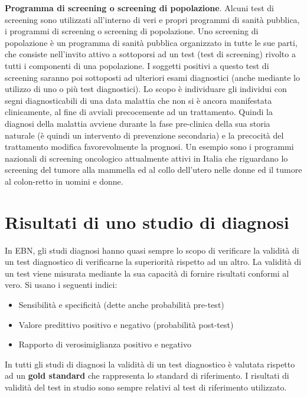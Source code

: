 \documentclass[]{book}
\begin{document}
\textbf{Programma di screening o screening di popolazione}.
Alcuni test di screening sono utilizzati all'interno di veri e propri programmi di sanità pubblica, i programmi di screening o screening di popolazione. Uno screening di popolazione è un programma di sanità pubblica organizzato in tutte le sue parti, che consiste nell'invito attivo a sottoporsi ad un test (test di screening) rivolto a tutti i componenti di una popolazione. I soggetti positivi a questo test di screening saranno poi sottoposti ad ulteriori esami diagnostici (anche mediante lo utilizzo di uno o più test diagnostici). Lo scopo è individuare gli individui con segni diagnosticabili di una data malattia che non si è ancora manifestata clinicamente, al fine di avviali precocemente ad un trattamento. Quindi la diagnosi della malattia avviene durante la fase pre-clinica della sua storia naturale (è quindi un intervento di prevenzione secondaria) e la precocità del trattamento modifica favorevolmente la prognosi. Un esempio sono i programmi nazionali di screening oncologico attualmente attivi in Italia che riguardano lo screening del tumore alla mammella ed al collo dell'utero nelle donne ed il tumore al colon-retto in uomini e donne.

\hypertarget{risultati-di-uno-studio-di-diagnosi}{%
\section{Risultati di uno studio di diagnosi}\label{risultati-di-uno-studio-di-diagnosi}}

In EBN, gli studi diagnosi hanno quasi sempre lo scopo di verificare la validità di un test diagnostico di verificarne la superiorità rispetto ad un altro. La validità di un test viene misurata mediante la sua capacità di fornire risultati conformi al vero. Si usano i seguenti indici:

\begin{itemize}
\item
  Sensibilità e specificità (dette anche probabilità pre-test)
\item
  Valore predittivo positivo e negativo (probabilità post-test)
\item
  Rapporto di verosimiglianza positivo e negativo
\end{itemize}

In tutti gli studi di diagnosi la validità di un test diagnostico è valutata rispetto ad un \textbf{gold standard} che rappresenta lo standard di riferimento. I risultati di validità del test in studio sono sempre relativi al test di riferimento utilizzato.
\end{document}
